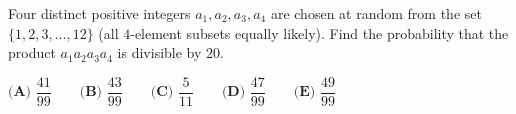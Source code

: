 Four distinct positive integers $a_1,a_2,a_3,a_4$ are chosen at random from the set $\{1,2,3,\dots,12\}$ (all $4$-element subsets equally likely). Find the probability that the product $a_1a_2a_3a_4$ is divisible by $20$.

$\textbf{(A) }\dfrac{41}{99}\qquad\textbf{(B) }\dfrac{43}{99}\qquad\textbf{(C) }\dfrac{5}{11}\qquad\textbf{(D) }\dfrac{47}{99}\qquad\textbf{(E) }\dfrac{49}{99}$
